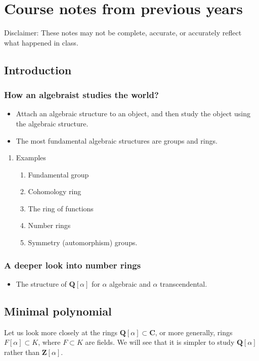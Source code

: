 \documentclass[11pt]{article}
\begin{document}
\vfill
\section{Course notes from previous years}
\label{sec:org1f98692}
Disclaimer: These notes may not be complete, accurate, or accurately reflect what happened in class.
\subsection{Introduction}
\label{sec:org48f86af}
\subsubsection{How an algebraist studies the world?}
\label{sec:org9e208ab}

\begin{itemize}
\item Attach an algebraic structure to an object, and then study the object using the algebraic structure.
\item The most fundamental algebraic structures are groups and rings.
\end{itemize}
\begin{enumerate}
\item Examples
\label{sec:orgc4eee6a}

\begin{enumerate}
\item Fundamental group
\item Cohomology ring
\item The ring of functions
\item Number rings
\item Symmetry (automorphism) groups.
\end{enumerate}
\end{enumerate}
\subsubsection{A deeper look into number rings}
\label{sec:org1bed5dd}

\begin{itemize}
\item The structure of \(\mathbf{Q}[\alpha]\) for \(\alpha\) algebraic and \(\alpha\) transcendental.
\end{itemize}
\subsection{Minimal polynomial}
\label{sec:orgc5081dc}
Let us look more closely at the rings \(\mathbf{Q}[\alpha] \subset \mathbf{C}\), or more generally, rings \(F[\alpha] \subset K\), where \(F \subset K\) are fields.
We will see that it is simpler to study \(\mathbf{Q}[\alpha]\) rather than \(\mathbf{Z}[\alpha]\).
\end{document}
